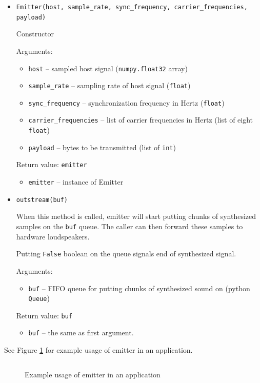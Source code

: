 \documentclass[english,bachelor,a4paper,oneside]{ppfcmthesis}
\begin{document}
\begin{itemize}
\item \verb|Emitter(host, sample_rate, sync_frequency, carrier_frequencies, payload)|

  Constructor

  Arguments:
  \begin{itemize}
  \item \verb|host| -- sampled host signal (\verb|numpy.float32| array)
  \item \verb|sample_rate| -- sampling rate of host signal (\verb|float|)
  \item \verb|sync_frequency| -- synchronization frequency in Hertz (\verb|float|)
  \item \verb|carrier_frequencies| -- list of carrier frequencies in Hertz (list of eight \verb|float|)
  \item \verb|payload| -- bytes to be transmitted (list of \verb|int|)
  \end{itemize}

  Return value: \verb|emitter|
  \begin{itemize}
  \item \verb|emitter| -- instance of Emitter
  \end{itemize}

\item \verb|outstream(buf)|

  When this method is called, emitter will start putting chunks of synthesized samples on the \verb|buf| queue. The caller can then forward these samples to hardware loudspeakers.

  Putting \verb|False| boolean on the queue signals end of synthesized signal.

  Arguments:
  \begin{itemize}
  \item \verb|buf| -- FIFO queue for putting chunks of synthesized sound on (python \verb|Queue|)
  \end{itemize}

  Return value: \verb|buf|
  \begin{itemize}
  \item \verb|buf| -- the same as first argument.
  \end{itemize}

\end{itemize}

See Figure \ref{fig:emitter-application} for example usage of emitter in an application.

\begin{figure}[h]
\centering
\inputminted[linenos]{python}{listings/emitter_example.py}
\caption{Example usage of emitter in an application}
\label{fig:emitter-application}
\end{figure}
\end{document}
